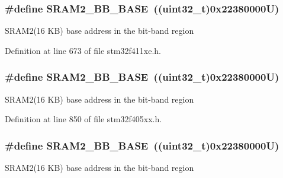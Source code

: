 \subsubsection[{\texorpdfstring{S\+R\+A\+M2\+\_\+\+B\+B\+\_\+\+B\+A\+SE}{SRAM2_BB_BASE}}]{\setlength{\rightskip}{0pt plus 5cm}\#define S\+R\+A\+M2\+\_\+\+B\+B\+\_\+\+B\+A\+SE~((uint32\+\_\+t)0x22380000\+U)}\hypertarget{group___peripheral__registers__structures_gac33cb6edadf184ab9860d77089503922}{}\label{group___peripheral__registers__structures_gac33cb6edadf184ab9860d77089503922}
S\+R\+A\+M2(16 K\+B) base address in the bit-\/band region 

Definition at line 673 of file stm32f411xe.\+h.

\subsubsection[{\texorpdfstring{S\+R\+A\+M2\+\_\+\+B\+B\+\_\+\+B\+A\+SE}{SRAM2_BB_BASE}}]{\setlength{\rightskip}{0pt plus 5cm}\#define S\+R\+A\+M2\+\_\+\+B\+B\+\_\+\+B\+A\+SE~((uint32\+\_\+t)0x22380000\+U)}\hypertarget{group___peripheral__registers__structures_gac33cb6edadf184ab9860d77089503922}{}\label{group___peripheral__registers__structures_gac33cb6edadf184ab9860d77089503922}
S\+R\+A\+M2(16 K\+B) base address in the bit-\/band region 

Definition at line 850 of file stm32f405xx.\+h.

\subsubsection[{\texorpdfstring{S\+R\+A\+M2\+\_\+\+B\+B\+\_\+\+B\+A\+SE}{SRAM2_BB_BASE}}]{\setlength{\rightskip}{0pt plus 5cm}\#define S\+R\+A\+M2\+\_\+\+B\+B\+\_\+\+B\+A\+SE~((uint32\+\_\+t)0x22380000\+U)}\hypertarget{group___peripheral__registers__structures_gac33cb6edadf184ab9860d77089503922}{}\label{group___peripheral__registers__structures_gac33cb6edadf184ab9860d77089503922}
S\+R\+A\+M2(16 K\+B) base address in the bit-\/band region 

